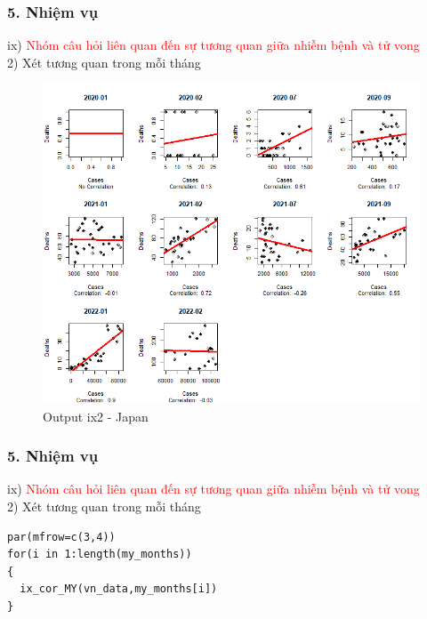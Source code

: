 \documentclass[english,10pt,table]{beamer}
\begin{document}
\begin{frame}[fragile]
\frametitle{5.  Nhiệm vụ}
ix) \textcolor{red}{Nhóm câu hỏi liên quan đến sự tương quan giữa nhiễm bệnh và tử vong}\\
    2) Xét tương quan trong mỗi tháng
	\begin{figure}[h!]
	\begin{center}
		    \includegraphics[scale = 0.36]{Images/IX/Japan.png}
		     \caption{Output ix2 - Japan}
		\end{center}
		\end{figure}
\end{frame}

\begin{frame}[fragile]
\frametitle{5.  Nhiệm vụ}
ix) \textcolor{red}{Nhóm câu hỏi liên quan đến sự tương quan giữa nhiễm bệnh và tử vong}\\
          2) Xét tương quan trong mỗi tháng
\lstset{
    title=Source code for Vietnam}
\begin{lstlisting}[frame=single]  
par(mfrow=c(3,4))
for(i in 1:length(my_months))
{
  ix_cor_MY(vn_data,my_months[i])
}
\end{lstlisting}
\end{frame}
\end{document}
